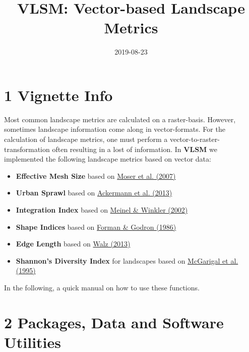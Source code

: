 \documentclass[]{article}
\title{VLSM: Vector-based Landscape Metrics}
\author{}
\date{2019-08-23}
\providecommand{\tightlist}{%
  \setlength{\itemsep}{0pt}\setlength{\parskip}{0pt}}
\begin{document}
\maketitle

\section{1 Vignette Info}\label{vignette-info}

Most common landscape metrics are calculated on a raster-basis. However,
sometimes landscape information come along in vector-formats. For the
calculation of landscape metrics, one must perform a
vector-to-raster-transformation often resulting in a lost of
information. In \textbf{VLSM} we implemented the following landscape
metrics based on vector data:

\begin{itemize}
\tightlist
\item
  \textbf{Effective Mesh Size} based on
  \href{https://doi.org/10.1007/s10980-006-9023-0}{Moser et al. (2007)}
\item
  \textbf{Urban Sprawl} based on
  \href{https://www.schulthess.com/buchshop/detail/ISBN-9783784340326/Ackermann-Werne-Schweiger-Manue-Sukopp-Ulrich-fuer-Naturschutz-BfN-Bundesam-Editor/Indikatoren-zur-biologischen-Vielfalt?bpmbutton211549=1\&bpmtoken=}{Ackermann
  et al. (2013)}
\item
  \textbf{Integration Index} based on
  \href{https://www2.ioer.de/recherche/pdf/2002_meinel_earsel.pdf}{Meinel
  \& Winkler (2002)}
\item
  \textbf{Shape Indices} based on
  \href{https://link.springer.com/journal/10980}{Forman \& Godron
  (1986)}
\item
  \textbf{Edge Length} based on
  \href{http://rosdok.uni-rostock.de/file/rosdok_disshab_0000000980/rosdok_derivate_0000005089/Habilitationsschrift_Walz_2013.pdf}{Walz
  (2013)}
\item
  \textbf{Shannon's Diversity Index} for landscapes based on
  \href{https://www.fs.usda.gov/treesearch/pubs/3064}{McGarigal et al.
  (1995)}
\end{itemize}

In the following, a quick manual on how to use these functions.

\section{2 Packages, Data and Software
Utilities}\label{packages-data-and-software-utilities}
\end{document}
